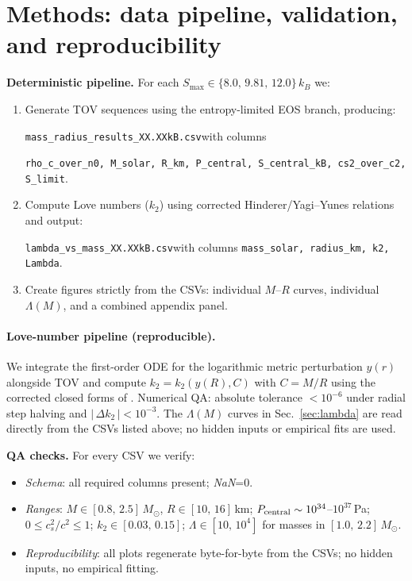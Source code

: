 \documentclass[11pt]{article}
\begin{document}
\section{Methods: data pipeline, validation, and reproducibility}
\label{sec:methods}
\textbf{Deterministic pipeline.} For each $S_{\max}\in\{8.0,\,9.81,\,12.0\}\,k_B$ we:
\begin{enumerate}[leftmargin=1.5em]
\item Generate TOV sequences using the entropy-limited EOS branch, producing:
\begin{center}\small
\verb|mass_radius_results_XX.XXkB.csv|\quad with columns\\
\rule{0pt}{1.2em}\verb|rho_c_over_n0, M_solar, R_km, P_central, S_central_kB, cs2_over_c2, S_limit|.
\end{center}
\item Compute Love numbers ($k_2$) using corrected Hinderer/Yagi--Yunes relations \cite{Hinderer2008,FlanaganHinderer2008,YagiYunes2013,YagiYunes2017} and output:
\begin{center}\small
\verb|lambda_vs_mass_XX.XXkB.csv|\quad with columns \verb|mass_solar, radius_km, k2, Lambda|.
\end{center}
\item Create figures strictly from the CSVs: individual $M$--$R$ curves, individual $\Lambda(M)$, and a combined appendix panel.
\end{enumerate}

\paragraph{Love-number pipeline (reproducible).}
We integrate the first-order ODE for the logarithmic metric perturbation $y(r)$ alongside TOV and compute $k_2=k_2\!\left(y(R),C\right)$ with $C=M/R$ using the corrected closed forms of \cite{Hinderer2008,FlanaganHinderer2008,YagiYunes2013,YagiYunes2017}. Numerical QA: absolute tolerance $<10^{-6}$ under radial step halving and $|\,\Delta k_2\,|<10^{-3}$. The $\Lambda(M)$ curves in Sec.~\ref{sec:lambda} are read directly from the CSVs listed above; no hidden inputs or empirical fits are used.

\noindent\textbf{QA checks.} For every CSV we verify:
\begin{itemize}[leftmargin=1.2em]
\item \emph{Schema}: all required columns present; \emph{NaN}=0.
\item \emph{Ranges}: $M\in[0.8,\,2.5]\,M_\odot$, $R\in[10,\,16]$\,km; $P_{\rm central}\sim10^{34}$--$10^{37}$\,Pa; $0\le c_s^2/c^2\le1$; $k_2\in[0.03,\,0.15]$; $\Lambda\in[10,\,10^4]$ for masses in $[1.0,\,2.2]\,M_\odot$.
\item \emph{Reproducibility}: all plots regenerate byte-for-byte from the CSVs; no hidden inputs, no empirical fitting.
\end{itemize}
\end{document}

